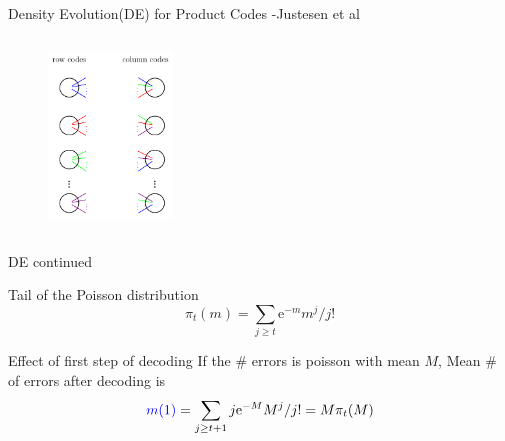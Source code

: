 \documentclass[10pt,xcolor=table]{beamer}
\begin{document}
\begin{frame}{Density Evolution(DE) for Product Codes -Justesen et al}
\begin{columns}
	   	\begin{figure}[t]
	   		\centering
	   		\includegraphics[width=1.3in]{./Figures/Bipartite_graph}
	   	\end{figure}
	   		
	   \end{columns}
	   
	\end{frame}
	\begin{frame}{DE continued}
		\begin{block}{Tail of the Poisson distribution}
			\begin{equation}\nonumber
			\pi_t(m) = \sum_{j \geq t} \mathrm{e}^{-m}m^j/j!
			\label{eqn:defpi}
			\end{equation}
		\end{block}
		
		\begin{block}{Effect of first step of decoding}
			If the \# errors is poisson with mean $M$, Mean \# of errors after decoding is
			\begin{equation}\nonumber
			\textcolor{blue}{m(1)} = \sum_{j \geq t+1} j\mathrm{e}^{-M}M^j/j! = M\pi_t(M)
			\label{eqn:defpi}
			\end{equation}
		\end{block}
		
	\end{frame}
\end{document}
